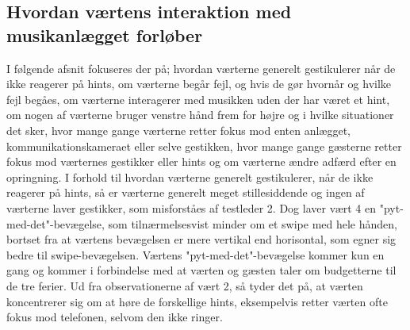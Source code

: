 \subsection{Hvordan værtens interaktion med musikanlægget forløber}
\label{TestresultaterSocialAcceptVaertsGestikker}
%
I følgende afsnit fokuseres der på; hvordan værterne generelt gestikulerer når de ikke reagerer på hints, om værterne begår fejl, og hvis de gør hvornår og hvilke fejl begåes, om værterne interagerer med musikken uden der har været et hint, om nogen af værterne bruger venstre hånd frem for højre og i hvilke situationer det sker, hvor mange gange værterne retter fokus mod enten anlægget, kommunikationskameraet eller selve gestikken, hvor mange gange gæsterne retter fokus mod værternes gestikker eller hints og om værterne ændre adfærd efter en opringning.\blankline
%
I forhold til hvordan værterne generelt gestikulerer, når de ikke reagerer på hints, så er værterne generelt meget stillesiddende og ingen af værterne laver gestikker, som misforståes af testleder 2. Dog laver vært 4 en "pyt-med-det"-bevægelse, som tilnærmelsesvist minder om et swipe med hele hånden, bortset fra at værtens bevægelsen er mere vertikal end horisontal, som egner sig bedre til swipe-bevægelsen. Værtens "pyt-med-det"-bevægelse kommer kun en gang og kommer i forbindelse med at værten og gæsten taler om budgetterne til de tre ferier. Ud fra observationerne af vært 2, så tyder det på, at værten koncentrerer sig om at høre de forskellige hints, eksempelvis retter værten ofte fokus mod telefonen, selvom den ikke ringer.\blankline
%
  


